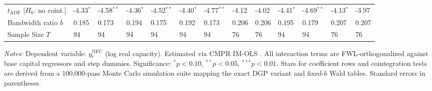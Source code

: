 \begin{table}[h!]
\begin{tabular}{p{3.2cm}p{1.0cm}p{1.0cm}p{1.0cm}p{1.0cm}p{1.0cm}p{1.0cm}p{1.0cm}p{1.0cm}p{1.0cm}p{1.0cm}p{1.0cm}p{1.0cm}}
		$t_{\text{ADF}}$ [$H_0$: no coint.] & -4.33$^{*}$ & -4.58$^{**}$ & -4.36$^{*}$ & -4.52$^{**}$ & -4.40$^{*}$ & -4.77$^{**}$ & -4.12 & -4.02 & -4.41$^{*}$ & -4.69$^{**}$ & -4.13$^{*}$ & -3.97 \\
		Bandwidth ratio $b$ & 0.185 & 0.173 & 0.194 & 0.175 & 0.192 & 0.173 & 0.206 & 0.206 & 0.195 & 0.179 & 0.207 & 0.207 \\
		Sample Size $T$ & 94 & 94 & 94 & 94 & 94 & 94 & 76 & 76 & 94 & 94 & 76 & 76 \\
		\bottomrule
	\end{tabular}
	\begin{minipage}{\textwidth}
		\scriptsize
		\textit{Notes:} Dependent variable: $y_t^{\text{NFC}}$ (log real capacity). Estimated via CMPR IM-OLS \citep{VogelsangWagner2024}. All interaction terms are FWL-orthogonalized against base capital regressors and step dummies. Significance: $^*p<0.10$, $^{**}p<0.05$, $^{***}p<0.01$. Stars for coefficient rows and cointegration tests are derived from a 100,000-pass Monte Carlo simulation suite mapping the exact DGP variant and fixed-$b$ Wald tables. Standard errors in parentheses.
	\end{minipage}
\end{table}


